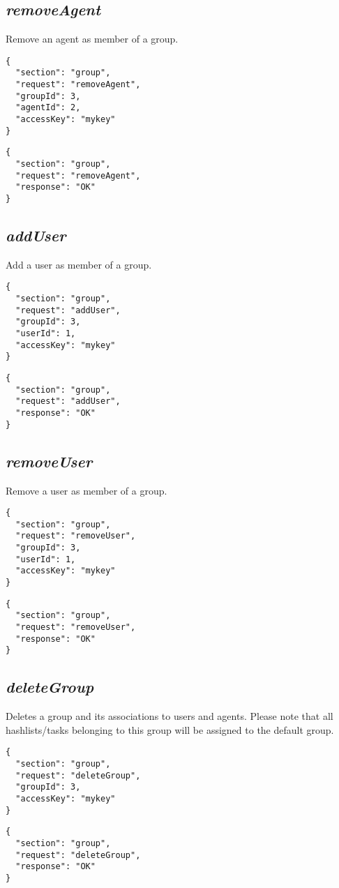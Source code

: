 \subsection*{\textit{removeAgent}}
	Remove an agent as member of a group.
	{
		\color{blue}
		\begin{verbatim}
{
  "section": "group",
  "request": "removeAgent",
  "groupId": 3,
  "agentId": 2,
  "accessKey": "mykey"
}
		\end{verbatim}
	}
	{
		\color{OliveGreen}
		\begin{verbatim}
{
  "section": "group",
  "request": "removeAgent",
  "response": "OK"
}
		\end{verbatim}
	}
\subsection*{\textit{addUser}}
	Add a user as member of a group.
	{
		\color{blue}
		\begin{verbatim}
{
  "section": "group",
  "request": "addUser",
  "groupId": 3,
  "userId": 1,
  "accessKey": "mykey"
}
		\end{verbatim}
	}
	{
		\color{OliveGreen}
		\begin{verbatim}
{
  "section": "group",
  "request": "addUser",
  "response": "OK"
}
		\end{verbatim}
	}
\subsection*{\textit{removeUser}}
	Remove a user as member of a group.
	{
		\color{blue}
		\begin{verbatim}
{
  "section": "group",
  "request": "removeUser",
  "groupId": 3,
  "userId": 1,
  "accessKey": "mykey"
}
		\end{verbatim}
	}
	{
		\color{OliveGreen}
		\begin{verbatim}
{
  "section": "group",
  "request": "removeUser",
  "response": "OK"
}
		\end{verbatim}
	}
\subsection*{\textit{deleteGroup}}
	Deletes a group and its associations to users and agents. Please note that all hashlists/tasks belonging to this group will be assigned to the default group.
	{
		\color{blue}
		\begin{verbatim}
{
  "section": "group",
  "request": "deleteGroup",
  "groupId": 3,
  "accessKey": "mykey"
}
		\end{verbatim}
	}
	{
		\color{OliveGreen}
		\begin{verbatim}
{
  "section": "group",
  "request": "deleteGroup",
  "response": "OK"
}
		\end{verbatim}
	}








